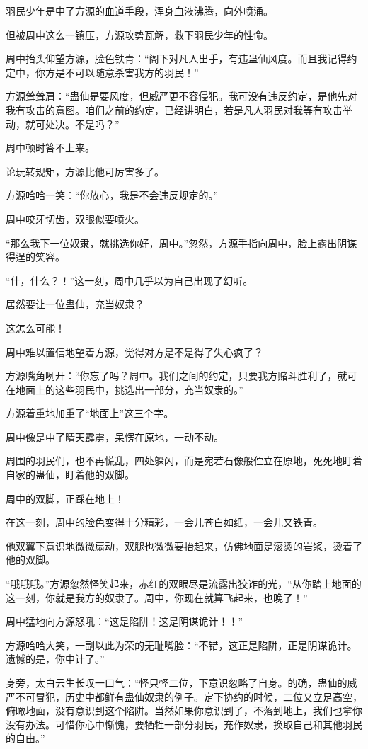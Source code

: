 \begin{this_body}
羽民少年是中了方源的血道手段，浑身血液沸腾，向外喷涌。

但被周中这么一镇压，方源攻势瓦解，救下羽民少年的性命。

周中抬头仰望方源，脸色铁青：“阁下对凡人出手，有违蛊仙风度。而且我记得约定中，你方是不可以随意杀害我方的羽民！”

方源耸耸肩：“蛊仙是要风度，但威严更不容侵犯。我可没有违反约定，是他先对我有攻击的意图。咱们之前的约定，已经讲明白，若是凡人羽民对我等有攻击举动，就可处决。不是吗？”

周中顿时答不上来。

论玩转规矩，方源比他可厉害多了。

方源哈哈一笑：“你放心，我是不会违反规定的。”

周中咬牙切齿，双眼似要喷火。

“那么我下一位奴隶，就挑选你好，周中。”忽然，方源手指向周中，脸上露出阴谋得逞的笑容。

“什，什么？！”这一刻，周中几乎以为自己出现了幻听。

居然要让一位蛊仙，充当奴隶？

这怎么可能！

周中难以置信地望着方源，觉得对方是不是得了失心疯了？

方源嘴角咧开：“你忘了吗？周中。我们之间的约定，只要我方赌斗胜利了，就可在地面上的这些羽民中，挑选出一部分，充当奴隶的。”

方源着重地加重了“地面上”这三个字。

周中像是中了晴天霹雳，呆愣在原地，一动不动。

周围的羽民们，也不再慌乱，四处躲闪，而是宛若石像般伫立在原地，死死地盯着自家的蛊仙，盯着他的双脚。

周中的双脚，正踩在地上！

在这一刻，周中的脸色变得十分精彩，一会儿苍白如纸，一会儿又铁青。

他双翼下意识地微微扇动，双腿也微微要抬起来，仿佛地面是滚烫的岩浆，烫着了他的双脚。

“哦哦哦。”方源忽然怪笑起来，赤红的双眼尽是流露出狡诈的光，“从你踏上地面的这一刻，你就是我方的奴隶了。周中，你现在就算飞起来，也晚了！”

周中猛地向方源怒吼：“这是陷阱！这是阴谋诡计！！”

方源哈哈大笑，一副以此为荣的无耻嘴脸：“不错，这正是陷阱，正是阴谋诡计。遗憾的是，你中计了。”

身旁，太白云生长叹一口气：“怪只怪二位，下意识忽略了自身。的确，蛊仙的威严不可冒犯，历史中都鲜有蛊仙奴隶的例子。定下协约的时候，二位又立足高空，俯瞰地面，没有意识到这个陷阱。当然如果你意识到了，不落到地上，我们也拿你没有办法。可惜你心中惭愧，要牺牲一部分羽民，充作奴隶，换取自己和其他羽民的自由。”


\end{this_body}
